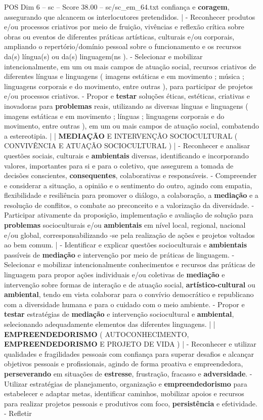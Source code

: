 \begin{textsample}{POS Dim 6 – sc – Score 38.00 – sc/sc\_em\_64.txt}
confiança e \textbf{coragem}, assegurando que alcancem os interlocutores pretendidos. | - Reconhecer produtos e/ou processos criativos por meio de fruição, vivências e reflexão crítica sobre obras ou eventos de diferentes práticas artísticas, culturais e/ou corporais, ampliando o repertório/domínio pessoal sobre o funcionamento e os recursos da(s) língua(s) ou da(s) linguagem(ns ). - Selecionar e mobilizar intencionalmente, em um ou mais campos de atuação social, recursos criativos de diferentes línguas e linguagens ( imagens estáticas e em movimento ; música ; linguagens corporais e do movimento, entre outras ), para participar de projetos e/ou processos criativos. - Propor e \textbf{testar} soluções éticas, estéticas, criativas e inovadoras para \textbf{problemas} reais, utilizando as diversas línguas e linguagens ( imagens estáticas e em movimento ; línguas ; linguagens corporais e do movimento, entre outras ), em um ou mais campos de atuação social, combatendo a estereotipia. | | \textbf{MEDIAÇÃO} E INTERVENÇÃO SOCIOCULTURAL ( CONVIVÊNCIA E ATUAÇÃO SOCIOCULTURAL ) | - Reconhecer e analisar questões sociais, culturais e \textbf{ambientais} diversas, identificando e incorporando valores, importantes para si e para o coletivo, que assegurem a tomada de decisões conscientes, \textbf{consequentes}, colaborativas e responsáveis. - Compreender e considerar a situação, a opinião e o sentimento do outro, agindo com empatia, flexibilidade e resiliência para promover o diálogo, a colaboração, a \textbf{mediação} e a resolução de conflitos, o combate ao preconceito e a valorização da diversidade. - Participar ativamente da proposição, implementação e avaliação de solução para \textbf{problemas} socioculturais e/ou \textbf{ambientais} em nível local, regional, nacional e/ou global, corresponsabilizando -se pela realização de ações e projetos voltados ao bem comum. | - Identificar e explicar questões socioculturais e \textbf{ambientais} passíveis de \textbf{mediação} e intervenção por meio de práticas de linguagem. - Selecionar e mobilizar intencionalmente conhecimentos e recursos das práticas de linguagem para propor ações individuais e/ou coletivas de \textbf{mediação} e intervenção sobre formas de interação e de atuação social, \textbf{artístico-cultural} ou \textbf{ambiental}, tendo em vista colaborar para o convívio democrático e republicano com a diversidade humana e para o cuidado com o meio ambiente. - Propor e \textbf{testar} estratégias de \textbf{mediação} e intervenção sociocultural e \textbf{ambiental}, selecionando adequadamente elementos das diferentes linguagens. | | \textbf{EMPREENDEDORISMO} ( AUTOCONHECIMENTO, \textbf{EMPREENDEDORISMO} E PROJETO DE VIDA ) | - Reconhecer e utilizar qualidades e fragilidades pessoais com confiança para superar desafios e alcançar objetivos pessoais e profissionais, agindo de forma proativa e empreendedora, \textbf{perseverando} em situações de \textbf{estresse}, frustração, fracasso e \textbf{adversidade}. - Utilizar estratégias de planejamento, organização e \textbf{empreendedorismo} para estabelecer e adaptar metas, identificar caminhos, mobilizar apoios e recursos para realizar projetos pessoais e produtivos com foco, \textbf{persistência} e efetividade. - Refletir 
\end{textsample}
